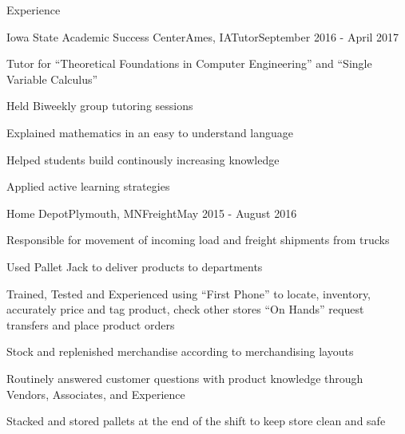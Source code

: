 \documentclass{resume} %
\begin{document}
\begin{rSection}{Experience}

\begin{rSubsection}{Iowa State Academic Success Center}{Ames, IA}{Tutor}{September 2016 - April 2017}
    \item {Tutor for ``Theoretical Foundations in Computer Engineering'' and ``Single Variable Calculus''}
    \item {Held Biweekly group tutoring sessions}
    \item {Explained mathematics in an easy to understand language}
    \item {Helped students build continously increasing knowledge}
       \item {Applied active learning strategies}
\end{rSubsection}

\begin{rSubsection}{Home Depot}{Plymouth, MN}{Freight}{May 2015 - August 2016}
    \item {Responsible for movement of incoming load and freight shipments from trucks }
    \item {Used Pallet Jack to deliver products to departments}
    \item {Trained, Tested and Experienced using ``First Phone'' to locate, inventory, accurately price and tag product, check other stores ``On Hands'' request transfers and place product orders}
    \item {Stock and replenished merchandise according to merchandising layouts}
    \item {Routinely answered customer questions with product knowledge through Vendors, Associates, and Experience}
        \item {Stacked and stored pallets at the end of the shift to keep store clean and safe}
\end{rSubsection}
	




\end{rSection}
\end{document}
